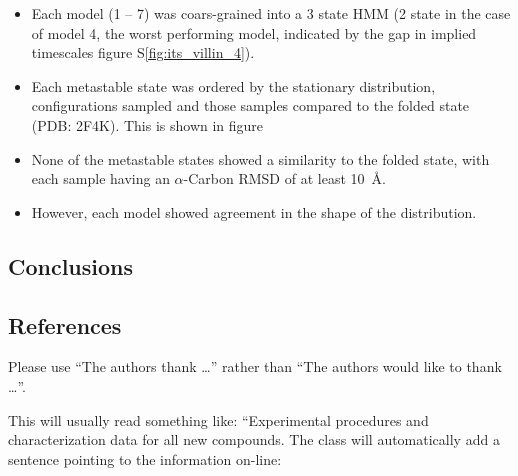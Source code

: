 \documentclass[journal=jacsat,manuscript=article]{achemso}
\newcommand*\sref[1]{%
    S\ref{#1}}
\begin{document}
\begin{itemize}
    \item Each model (1 -- 7) was coars-grained into a 3 state HMM (2 state in the case of model 4, the worst performing model, indicated by the gap in implied timescales figure \sref{fig:its_villin_4}). 
    \item Each metastable state was ordered by the stationary distribution, configurations sampled and those samples compared to the folded state (PDB: 2F4K). This is shown in figure  
    \item None of the metastable states showed a similarity to the folded state, with each sample having an $\alpha$-Carbon RMSD of at least \SI{10}{\angstrom}.  
    \item However, each model showed agreement in the shape of the distribution.  
\end{itemize}

\subsection{Conclusions}



\subsection{References}



\begin{acknowledgement}

Please use ``The authors thank \ldots'' rather than ``The
authors would like to thank \ldots''.


\end{acknowledgement}

\begin{suppinfo}

This will usually read something like: ``Experimental procedures and
characterization data for all new compounds. The class will
automatically add a sentence pointing to the information on-line:

\end{suppinfo}


\end{document}
